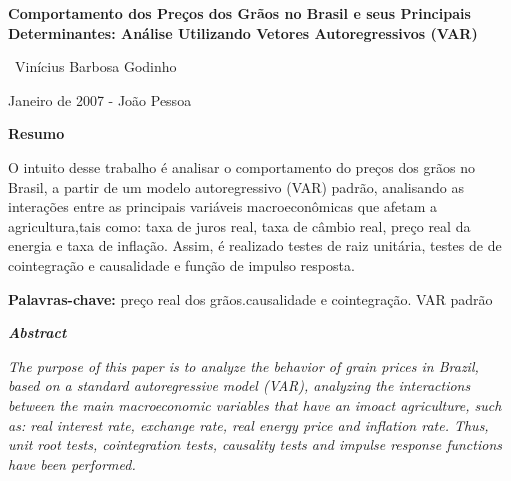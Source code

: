 \documentclass[a4paper,12pt,oneside,titlepage]{article}
\begin{document}
\begin{center}
\textbf{\LARGE{Comportamento dos Preços dos Grãos no Brasil e seus Principais Determinantes: Análise Utilizando Vetores Autoregressivos (VAR)}}	
\end{center}	

\vspace{3pt}

\begin{center}
\ Vinícius Barbosa Godinho

\vspace{3pt}

Janeiro de 2007 - João Pessoa
\end{center}
\vspace{6pt}
\begin{center}
	
\textbf{Resumo}
\end{center}
\vspace{6pt}
\noindent O intuito desse trabalho é analisar o comportamento do preços dos grãos no Brasil, a partir de um modelo autoregressivo (VAR) padrão, analisando as interações entre as principais variáveis macroeconômicas que afetam a agricultura,tais como: taxa de juros real, taxa de câmbio real, preço real da energia e taxa de inflação. Assim, é realizado testes de raiz unitária, testes de de cointegração e causalidade e função de impulso resposta.   


\vspace{12 pt} 

	\noindent
\textbf{Palavras-chave:} preço real dos grãos.causalidade e cointegração. VAR padrão



\vspace{6pt}
\begin{center}
\textbf{\textit{Abstract}}	
\end{center}


\vspace{6pt}	
	\noindent 	\textit{The purpose of this paper is to analyze the behavior of grain prices in Brazil, based on a standard autoregressive model (VAR), analyzing the interactions between the main macroeconomic variables that have an imoact agriculture, such as: real interest rate, exchange rate, real energy price and inflation rate. Thus, unit root tests, cointegration tests, causality tests and impulse response functions have been performed.}
	
\end{document}
